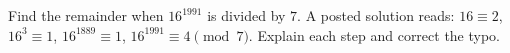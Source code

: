 Find the remainder when $16^{1991}$ is divided by $7$. A posted solution reads: $16\equiv2$, $16^3\equiv1$, $16^{1889}\equiv1$, $16^{1991}\equiv4\pmod 7$. Explain each step and correct the typo.
